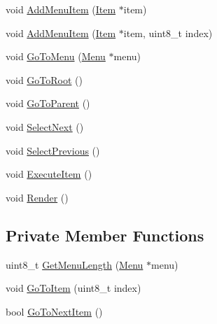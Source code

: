 \begin{DoxyCompactItemize}
\item 
void \hyperlink{class_menu_1_1_controller_a777d65ba4f168aed6c1c44022ca4c658}{Add\+Menu\+Item} (\hyperlink{struct_menu_1_1_item}{Item} $\ast$item)
\item 
void \hyperlink{class_menu_1_1_controller_a9e5366f182975680e88749f03d249a0a}{Add\+Menu\+Item} (\hyperlink{struct_menu_1_1_item}{Item} $\ast$item, uint8\+\_\+t index)
\item 
void \hyperlink{class_menu_1_1_controller_a1df8e49520c77372d479903c3ec93341}{Go\+To\+Menu} (\hyperlink{struct_menu_1_1_menu}{Menu} $\ast$menu)
\item 
void \hyperlink{class_menu_1_1_controller_a787911ef46ca1968c2fd667af1f9ac27}{Go\+To\+Root} ()
\item 
void \hyperlink{class_menu_1_1_controller_ab30a038c4e4e3cb102d419c11a6813f6}{Go\+To\+Parent} ()
\item 
void \hyperlink{class_menu_1_1_controller_a9aabc6ba652c29efa7a02e12f51ce0b1}{Select\+Next} ()
\item 
void \hyperlink{class_menu_1_1_controller_a04e3448cfe4341ad7209a9f16bbcb449}{Select\+Previous} ()
\item 
void \hyperlink{class_menu_1_1_controller_a0dda40652b8802a8fe39c1ce61a66f1a}{Execute\+Item} ()
\item 
void \hyperlink{class_menu_1_1_controller_af46abb3d242c76822c0e8ea8ab777fa5}{Render} ()
\end{DoxyCompactItemize}
\subsection*{Private Member Functions}
\begin{DoxyCompactItemize}
\item 
uint8\+\_\+t \hyperlink{class_menu_1_1_controller_a24009cee76b147079041b2130a806027}{Get\+Menu\+Length} (\hyperlink{struct_menu_1_1_menu}{Menu} $\ast$menu)
\item 
void \hyperlink{class_menu_1_1_controller_afa4a1e26efe90dd5d9479bb8c84404b6}{Go\+To\+Item} (uint8\+\_\+t index)
\item 
bool \hyperlink{class_menu_1_1_controller_ad93989bb6a9ed55f67ad5c15e666cf39}{Go\+To\+Next\+Item} ()
\end{DoxyCompactItemize}
